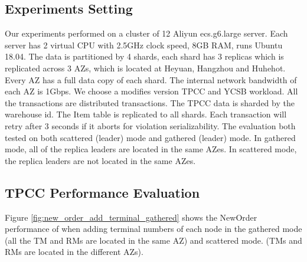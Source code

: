 \documentclass[conference]{IEEEtran}
\begin{document}
\subsection{Experiments Setting}
Our experiments performed on a cluster of 12 Aliyun ecs.g6.large server.
Each server has 2 virtual CPU with 2.5GHz clock speed, 8GB RAM, runs Ubuntu 18.04.
The data is partitioned by 4 shards, each shard has 3 replicas which is replicated across 3 AZs, which is located at Heyuan, Hangzhou and Huhehot.
Every AZ has a full data copy of each shard.
The internal network bandwidth of each AZ is 1Gbps.
We choose a modifies version TPCC and YCSB workload.
All the transactions are distributed transactions.
The TPCC data is sharded by the warehouse id.
The Item table is replicated to all shards.
Each transaction will retry after 3 seconds if it aborts for violation serializability.
The evaluation both tested on both scattered (leader) mode and gathered (leader) mode.
In gathered mode, all of the replica leaders are located in the same AZes.
In scattered mode, the replica leaders are not located in the same AZes.

\subsection{TPCC Performance Evaluation}
Figure \ref{fig:new_order_add_terminal_gathered} shows the NewOrder performance of when adding terminal numbers of each node in the gathered  mode
(all the TM and RMs are located in the same AZ) and scattered mode.
(TMs and RMs are located in the different AZs).
\end{document}
